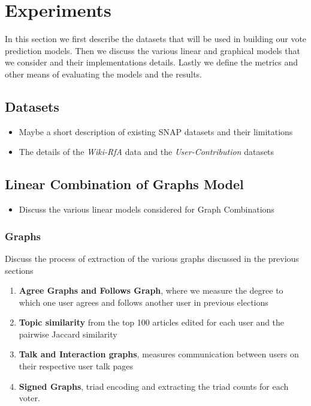 \chapter{Experiments}
\label{chp:experiments}
In this section we first describe the datasets that will be used in building our vote prediction models. Then we discuss the various linear and graphical models that we consider and their implementations details. Lastly we define the metrics and other means of evaluating the models and the results.

\section{Datasets}
\begin{itemize}
    \item Maybe a short description of existing SNAP datasets and their limitations
    \item The details of the \textit{Wiki-RfA} data and the \textit{User-Contribution} datasets
\end{itemize}

\section{Linear Combination of Graphs Model}
\begin{itemize}
    \item Discuss the various linear models considered for Graph Combinations
\end{itemize}    
\subsection{Graphs}
    Discuss the process of extraction of the various graphs discussed in the previous sections
    \begin{enumerate}
        \item \textbf{Agree Graphs and Follows Graph}, where we measure the degree to which one user agrees and follows another user in previous elections
        \item \textbf{Topic similarity} from the top 100 articles edited for each user and the pairwise Jaccard similarity 
        \item \textbf{Talk and Interaction graphs}, measures communication between users on their respective user talk pages
        \item \textbf{Signed Graphs}, triad encoding and extracting the triad counts for each voter. 
\end{enumerate}
